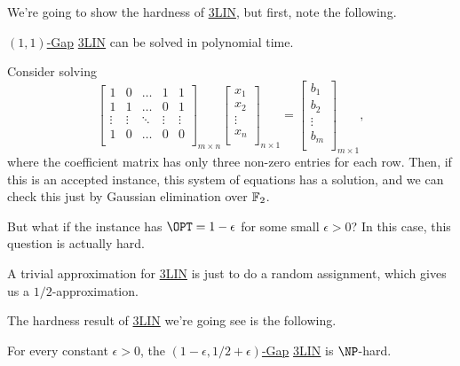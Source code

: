 We're going to show the hardness of \hyperref[prb:max-3LIN]{3LIN}, but first, note the following.
\begin{claim}
	\hyperref[def:c-s-Gap]{\((1, 1)\)-Gap} \hyperref[prb:max-3LIN]{3LIN} can be solved in polynomial time.
\end{claim}
\begin{explanation}
	Consider solving
	\[
		\begin{bmatrix}
			1      & 0      & \ldots & 1      & 1      \\
			1      & 1      & \ldots & 0      & 1      \\
			\vdots & \vdots & \ddots & \vdots & \vdots \\
			1      & 0      & \ldots & 0      & 0      \\
		\end{bmatrix}_{m\times n} \begin{bmatrix}
			x_1    \\
			x_2    \\
			\vdots \\
			x_n    \\
		\end{bmatrix}_{n\times 1} = \begin{bmatrix}
			b_1    \\
			b_2    \\
			\vdots \\
			b_m    \\
		\end{bmatrix}_{m\times 1},
	\]
	where the coefficient matrix has only three non-zero entries for each row. Then, if this is an accepted instance, this system of equations has a solution, and we can check this just by Gaussian elimination over \(\mathbb{\MakeUppercase{f}} _2\).
\end{explanation}

But what if the instance has \(\OPT = 1 - \epsilon \) for some small \(\epsilon > 0\)? In this case, this question is actually hard.

\begin{remark}
	A trivial approximation for \hyperref[prb:max-3LIN]{3LIN} is just to do a random assignment, which gives us a \(1 / 2\)-approximation.
\end{remark}

The hardness result of \hyperref[prb:max-3LIN]{3LIN} we're going see is the following.

\begin{theorem}[\cite{10.1145/258533.258536}]\label{thm:3LIN}
	For every constant \(\epsilon >0\), the \hyperref[def:c-s-Gap]{\((1 - \epsilon , 1 / 2 + \epsilon )\)-Gap} \hyperref[prb:max-3LIN]{3LIN} is \(\NP\)-hard.
\end{theorem}

